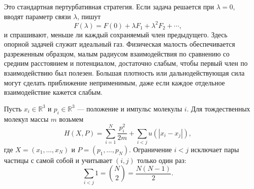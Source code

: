 \begin{classroomqa}   \end{classroomqa}

Это стандартная пертурбативная стратегия. Если задача решается при \(\lambda=0\), вводят параметр связи \(\lambda\), пишут \begin{equation}
 F(\lambda)=F(0)+\lambda F_1+\lambda^2F_2+\cdots,
 \label{eq:sm6-perturbative-template}
\end{equation} и спрашивают, меньше ли каждый сохраняемый член предыдущего. Здесь опорной задачей служит идеальный газ. Физическая малость обеспечивается разреженным образцом, малым радиусом взаимодействия по сравнению со средним расстоянием и потенциалом, достаточно слабым, чтобы первый член по взаимодействию был полезен. Большая плотность или дальнодействующая сила могут сделать приближение неприменимым, даже если каждое отдельное взаимодействие кажется слабым.

Пусть \(x_i\in\mathbb R^3\) и \(p_i\in\mathbb R^3\) — положение и импульс молекулы \(i\). Для тождественных молекул массы \(m\) возьмем \begin{equation}
 H(X,P)=
 \sum_{i=1}^{N}\frac{p_i^2}{2m}
 +\sum_{i<j}u\!\left(|x_i-x_j|\right),
 \label{eq:sm6-interacting-hamiltonian}
\end{equation} где \(X=(x_1,\ldots,x_N)\) и \(P=(p_1,\ldots,p_N)\). Ограничение \(i<j\) исключает пары частицы с самой собой и учитывает \((i,j)\) только один раз: \begin{equation}
 \sum_{i<j}1=\binom{N}{2}=\frac{N(N-1)}{2}.
 \label{eq:sm6-pair-count}
\end{equation}

\begin{classroomqa}   \end{classroomqa}

